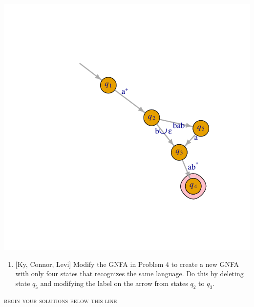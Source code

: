 \documentclass[
  twoside]{article}
\providecommand{\tightlist}{%
  \setlength{\itemsep}{0pt}\setlength{\parskip}{0pt}}
\begin{document}
\begin{center}\includegraphics{p13Areg_exp_files/figure-latex/unnamed-chunk-2-1} \end{center}

\begin{enumerate}
\def\labelenumi{\arabic{enumi}.}
\setcounter{enumi}{4}
\tightlist
\item
  {[}Ky, Connor, Levi{]} Modify the GNFA in Problem 4 to create a new
  GNFA with only four states that recognizes the same language. Do this
  by deleting state \(q_5\) and modifying the label on the arrow from
  states \(q_2\) to \(q_3\).
\end{enumerate}

\medskip

\mbox{}\xrfill[2pt]{1pt}\textsc{\small begin your solutions below this line}\xrfill[2pt]{1pt}\mbox{}
\end{document}
